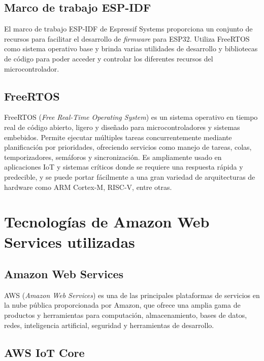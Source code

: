 \subsection{Marco de trabajo ESP-IDF}

El marco de trabajo ESP-IDF\cite{ESPIDF_home} de Espressif Systems proporciona un conjunto de recursos para facilitar el desarrollo de \textit{firmware} para ESP32. Utiliza FreeRTOS como sistema operativo base y brinda varias utilidades de desarrollo y bibliotecas de código para poder acceder y controlar los diferentes recursos del microcontrolador.


\subsection{FreeRTOS}

FreeRTOS (\textit{Free Real-Time Operating System}) \citep{FreeRTOS} es un sistema operativo en tiempo real de código abierto, ligero y diseñado para microcontroladores y sistemas embebidos. Permite ejecutar múltiples tareas concurrentemente mediante planificación por prioridades, ofreciendo servicios como manejo de tareas, colas, temporizadores, semáforos y sincronización. Es ampliamente usado en aplicaciones IoT y sistemas críticos donde se requiere una respuesta rápida y predecible, y se puede portar fácilmente a una gran variedad de arquitecturas de hardware como ARM Cortex-M, RISC-V, entre otras.




\section{Tecnologías de Amazon Web Services utilizadas}


\subsection{Amazon Web Services}

AWS (\textit{Amazon Web Services}) \citep{aws}  es una de las principales plataformas de servicios en la nube pública proporcionada por Amazon, que ofrece una amplia gama de productos y herramientas para computación, almacenamiento, bases de datos, redes, inteligencia artificial, seguridad y herramientas de desarrollo.



\subsection{AWS IoT Core}

